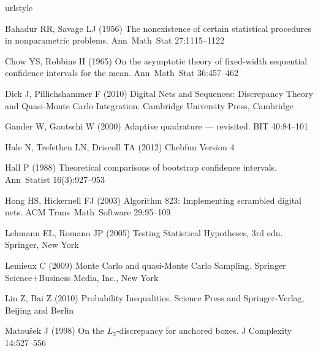 \documentclass[graybox]{svmult}
\begin{document}
\begin{thebibliography}{29}
\providecommand{\natexlab}[1]{#1}
\providecommand{\url}[1]{{#1}}
\providecommand{\urlprefix}{URL }
\expandafter\ifx\csname urlstyle\endcsname\relax
  \providecommand{\doi}[1]{DOI~\discretionary{}{}{}#1}\else
  \providecommand{\doi}{DOI~\discretionary{}{}{}\begingroup
  \urlstyle{rm}\Url}\fi
\providecommand{\eprint}[2][]{\url{#2}}

Bahadur RR, Savage LJ (1956) The nonexistence of certain statistical procedures
  in nonparametric problems. Ann\ Math\ Stat 27:1115--1122

Chow YS, Robbins H (1965) On the asymptotic theory of fixed-width sequential
  confidence intervals for the mean. Ann\ Math\ Stat 36:457--462

Dick J, Pillichshammer F (2010) Digital Nets and Sequences: Discrepancy Theory
  and Quasi-{M}onte {C}arlo Integration. Cambridge University Press, Cambridge

Gander W, Gautschi W (2000) Adaptive quadrature --- revisited. BIT 40:84--101

Hale N, Trefethen LN, Driscoll TA (2012) Chebfun Version 4

Hall P (1988) Theoretical comparisons of bootstrap confidence intervals. Ann\
  Statist 16(3):927--953

Hong HS, Hickernell FJ (2003) Algorithm 823: Implementing scrambled digital
  nets. ACM Trans\ Math\ Software 29:95--109

Lehmann EL, Romano JP (2005) Testing Statistical Hypotheses, 3rd edn. Springer,
  New York

Lemieux C (2009) {M}onte {C}arlo and quasi-{M}onte {C}arlo Sampling. Springer
  Science+Business Media, Inc., New York

Lin Z, Bai Z (2010) Probability Inequalities. Science Press and
  Springer-Verlag, Beijing and Berlin

Matou\v{s}ek J (1998) On the {$L_2$}-discrepancy for anchored boxes. J
  Complexity 14:527--556


\end{thebibliography}
\end{document}
